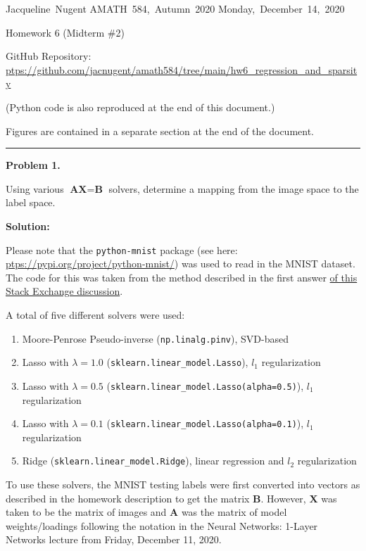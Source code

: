 \documentclass[10pt]{article}
\begin{document}
\hfill\vbox{\hbox{Jacqueline Nugent}
\hbox{AMATH 584, Autumn 2020}
\hbox{Monday, December 14, 2020}}

\vskip 10pt
\centerline{\Large{Homework 6 (Midterm \#2)}}
\vskip 5pt
\centerline{\small{GitHub Repository: \url{ptps://github.com/jacnugent/amath584/tree/main/hw6_regression_and_sparsity}}}
\centerline{\small{(Python code is also reproduced at the end of this document.)}}
\vskip 5pt
\centerline{\small{Figures are contained in a separate section at the end of the document.}}



\vskip 1cm
\hrule
{\bf Problem 1.}

Using various $\textbf{AX}=\textbf{B}$ solvers, determine a mapping from the image space to the label space.

\vskip 0.5cm
{\bf Solution:}

Please note that the \texttt{python-mnist} package (see here: \url{ptps://pypi.org/project/python-mnist/}) was used to read in the MNIST dataset. The code for this was taken from the method described in the first answer \href{ptps://stackoverflow.com/questions/40427435/extract-images-from-idx3-ubyte-file-or-gzip-via-python}{of this Stack Exchange discussion}. 

A total of five different solvers were used:
\begin{enumerate}
\item Moore-Penrose Pseudo-inverse (\texttt{np.linalg.pinv}), SVD-based
\item Lasso with $\lambda=1.0$ (\texttt{sklearn.linear\_model.Lasso}), $l_1$ regularization
\item Lasso with $\lambda=0.5$ (\texttt{sklearn.linear\_model.Lasso(alpha=0.5)}), $l_1$ regularization
\item Lasso with $\lambda=0.1$ (\texttt{sklearn.linear\_model.Lasso(alpha=0.1)}), $l_1$ regularization
\item Ridge (\texttt{sklearn.linear\_model.Ridge}), linear regression and $l_2$ regularization
\end{enumerate}

To use these solvers, the MNIST testing labels were first converted into vectors as described in the homework description to get the matrix $\textbf{B}$. However, $\textbf{X}$ was taken to be the matrix of images and $\textbf{A}$ was the matrix of model weights/loadings following the notation in the Neural Networks: 1-Layer Networks lecture from Friday, December 11, 2020.
\end{document}
